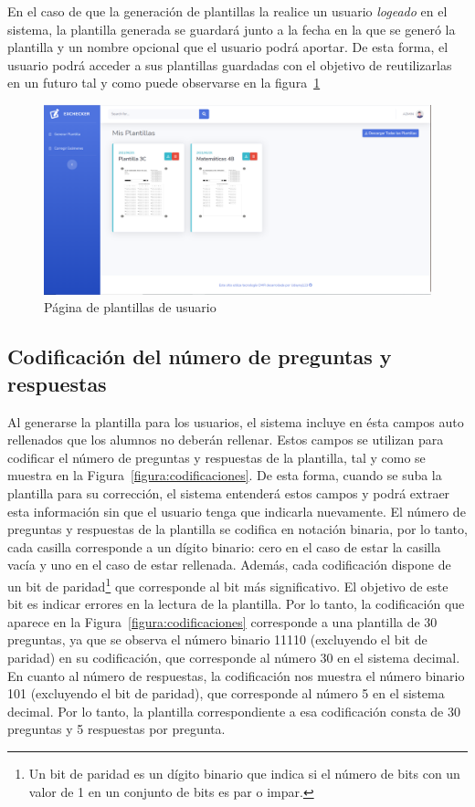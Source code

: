 \documentclass[a4paper, 12pt]{book}
\begin{document}
En el caso de que la generación de plantillas la realice un usuario \textit{logeado} en el
sistema, la plantilla generada se guardará junto a la fecha en la que se generó
la plantilla y un nombre
opcional que el usuario podrá aportar. De esta forma, el usuario podrá acceder a sus
plantillas guardadas con el objetivo de reutilizarlas en un futuro tal y como puede
observarse en la figura~\ref{figura:plantillas_usuario}

\begin{figure}
  \centering
  \includegraphics[width=12cm, keepaspectratio]{img/plantillas_usuario}
  \caption{Página de plantillas de usuario}
  \label{figura:plantillas_usuario}
\end{figure}

\subsection{Codificación del número de preguntas y respuestas}
\label{subsec:codificacion}

Al generarse la plantilla para los usuarios, el sistema incluye en ésta
campos auto rellenados que los alumnos no deberán rellenar.
Estos campos se utilizan para codificar el número de preguntas y respuestas
de la plantilla, tal y como se muestra en la
Figura~\ref{figura:codificaciones}.
De esta forma, cuando se suba la plantilla para su
corrección, el sistema entenderá estos campos y podrá extraer esta información
sin que el usuario tenga que indicarla nuevamente. El número de preguntas y respuestas
de la plantilla se codifica en notación binaria, por lo tanto, cada casilla
corresponde a un dígito binario: cero en el caso de estar la casilla vacía y uno
en el caso de estar rellenada. Además, cada codificación dispone de un bit de
paridad\footnote{Un bit de paridad es un dígito binario que indica si el
número de bits con un valor de 1 en un conjunto de bits es par o impar.}
que corresponde al bit más significativo. El objetivo de este bit es indicar
errores en la lectura de la plantilla. Por lo tanto, la codificación que aparece
en la Figura~\ref{figura:codificaciones} corresponde a una plantilla de 30
preguntas, ya que se observa el número binario 11110 (excluyendo el bit de paridad)
en su codificación, que corresponde al número 30 en el sistema decimal.
En cuanto al número de respuestas, la codificación nos muestra el número binario
101 (excluyendo el bit de paridad), que corresponde
al número 5 en el sistema decimal. Por lo tanto, la plantilla correspondiente
a esa codificación consta de
30 preguntas y 5 respuestas por pregunta.
\end{document}
